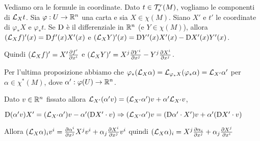 Vediamo ora le formule in coordinate.
Dato $t\in\mathcal T_s^r(M)$, vogliamo le componenti di $\mathcal L_Xt$.
Sia $\varphi: U \to \mathbb R^n$ una carta e sia $X\in\chi(M)$. Siano $X'$ e $t'$ le coordinate di $\varphi_*X$ e $\varphi_*t$.
Se $\mathrm D$ è il differenziale in $\mathbb R^n$ (e $Y\in\chi(M)$), allora
$(\mathcal L_Xf)' (x) = \mathrm D f'(x) X'(x)$ e $(\mathcal L_XY)'(x) = \mathrm D Y'(x)X'(x) - \mathrm D X'(x)Y'(x)$.

Quindi $(\mathcal L_X f)' = X' \frac{\partial f'}{\partial x^i}$ e $(\mathcal L_XY)' = X^j\frac{\partial Y^i}{\partial x^j} - Y^j\frac{\partial X^i}{\partial x^j}$.

Per l'ultima proposizione abbiamo che $\varphi_*(\mathcal L_X\alpha) = \mathcal L_{\varphi_*X}(\varphi_*\alpha) = \mathcal L_{X'}\alpha'$ per $\alpha\in\chi^*(M)$, dove $\alpha' : \varphi(U)\to\mathbb R^n$.

Dato $v\in\mathbb R^n$ fissato allora $\mathcal L_{X'}(\alpha'v) = (\mathcal L_{X'}\alpha')v + \alpha'\mathcal L_{X'}v$,

$\mathrm D (\alpha'v)X' = (\mathcal L_{X'} \alpha') v - \alpha'(\mathrm D X' \cdot v) \Rightarrow (\mathcal L_{X'}\alpha') v = (\mathrm D \alpha' \cdot X') v + \alpha' (\mathrm D X' \cdot v)$ 

Allora $(\mathcal L_X\alpha)_iv^i = \frac{\partial \alpha^i}{\partial x^j}X^jv^i + \alpha_j\frac{\partial X^i}{\partial x^j}v^i$
quindi $(\mathcal L_X\alpha)_i = X^j\frac{\partial \alpha_i}{\partial x^j} + \alpha_j\frac{\partial X^j}{\partial x^i}$



































































